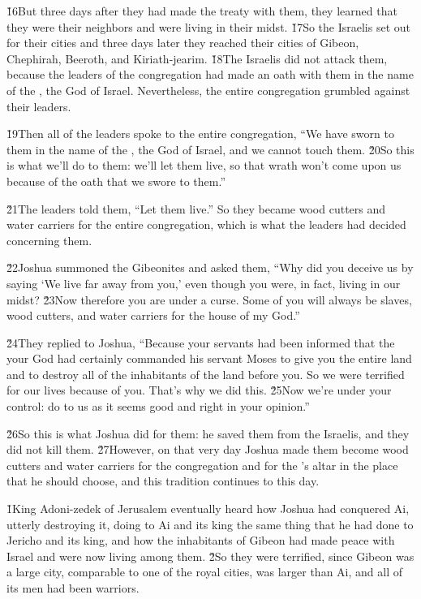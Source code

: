 \v{16}But three days after they had made the treaty with them, they learned that they were their neighbors and were living in their midst. \v{17}So the Israelis set out for their cities and three days later they reached their cities of Gibeon, Chephirah, Beeroth, and Kiriath-jearim. \v{18}The Israelis did not attack them, because the leaders of the congregation had made an oath with them in the name of the , the God of Israel. Nevertheless, the entire congregation grumbled against their leaders.

\v{19}Then all of the leaders spoke to the entire congregation, ``We have sworn to them in the name of the , the God of Israel, and we cannot touch them. \v{20}So this is what we'll do to them: we'll let them live, so that wrath won't come upon us because of the oath that we swore to them.''

\v{21}The leaders told them, ``Let them live.'' So they became wood cutters and water carriers for the entire congregation, which is what the leaders had decided concerning them.

\v{22}Joshua summoned the Gibeonites and asked them, ``Why did you deceive us by saying `We live far away from you,' even though you were, in fact, living in our midst? \v{23}Now therefore you are under a curse. Some of you will always be slaves, wood cutters, and water carriers for the house of my God.''

\v{24}They replied to Joshua, ``Because your servants had been informed that the  your God had certainly commanded his servant Moses to give you the entire land and to destroy all of the inhabitants of the land before you. So we were terrified for our lives because of you. That's why we did this. \v{25}Now we're under your control: do to us as it seems good and right in your opinion.''

\v{26}So this is what Joshua did for them: he saved them from the Israelis, and they did not kill them. \v{27}However, on that very day Joshua made them become wood cutters and water carriers for the congregation and for the 's altar in the place that he should choose, and this tradition continues to this day.

\v{1}King Adoni-zedek of Jerusalem eventually heard how Joshua had conquered Ai, utterly destroying it, doing to Ai and its king the same thing that he had done to Jericho and its king, and how the inhabitants of Gibeon had made peace with Israel and were now living among them. \v{2}So they were terrified, since Gibeon was a large city, comparable to one of the royal cities, was larger than Ai, and all of its men had been warriors.

